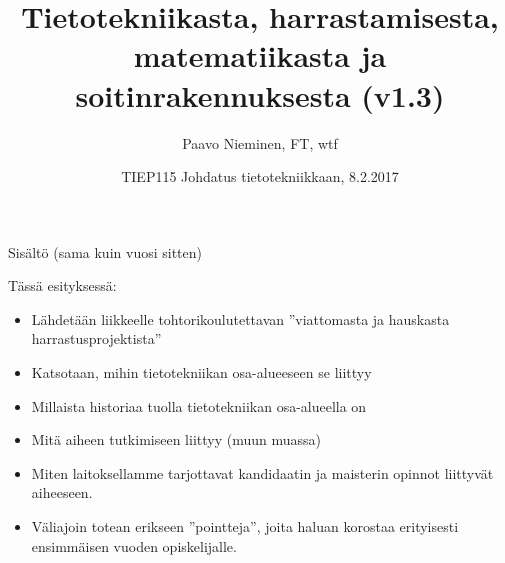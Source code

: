 \documentclass[pdf,9pt,handout]{beamer}
\title[TIEP115]
{Tietotekniikasta, harrastamisesta, matematiikasta ja soitinrakennuksesta (v1.3)}
\author{Paavo Nieminen, FT, wtf}
\date{TIEP115 Johdatus tietotekniikkaan, 8.2.2017}
\begin{document}
\begin{frame}
  \titlepage
\end{frame}

\begin{frame}{Sisältö (sama kuin vuosi sitten)}
    \begin{minipage}{\textwidth}
       \linespread{1.4}
       \tableofcontents
    \end{minipage}
\end{frame}
\beamerdefaultoverlayspecification{<+->}

\begin{frame}{Tässä esityksessä:}
  \begin{itemize}
  \item Lähdetään liikkeelle tohtorikoulutettavan ''viattomasta ja
    hauskasta harrastusprojektista''
  \item Katsotaan, mihin tietotekniikan osa-alueeseen se liittyy
  \item Millaista historiaa tuolla tietotekniikan osa-alueella on
  \item Mitä aiheen tutkimiseen liittyy (muun muassa)
  \item Miten laitoksellamme tarjottavat kandidaatin ja maisterin
    opinnot liittyvät aiheeseen.
  \item Väliajoin totean erikseen ''pointteja'', joita haluan korostaa
    erityisesti ensimmäisen vuoden opiskelijalle.
  \end{itemize}
\end{frame}
\end{document}
